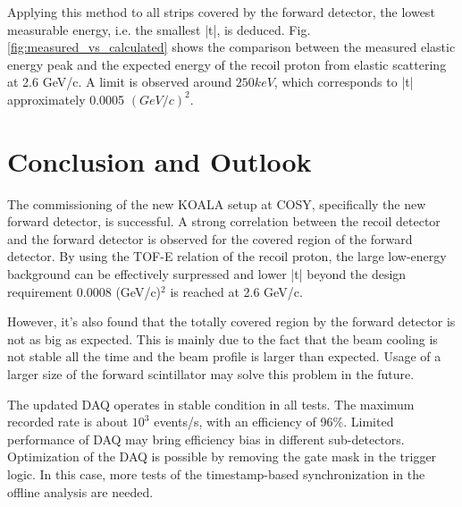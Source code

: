 \documentclass[number,5p]{elsarticle}
\begin{document}
Applying this method to all strips covered by the forward detector, the lowest measurable energy, i.e. the smallest |t|, is deduced.
Fig. \ref{fig:measured_vs_calculated} shows the comparison between the measured
elastic energy peak and the expected energy of the recoil proton from elastic scattering at 2.6 GeV/c.
A limit is observed around \(250 keV\), which corresponds to |t| approximately 0.0005 \((GeV/c)^2\).

\section{Conclusion and Outlook}
\label{sec:conclusion}

The commissioning of the new KOALA setup at COSY, specifically the new forward detector, is successful.
A strong correlation between the recoil detector and the forward detector is
observed for the covered region of the forward detector.
By using the TOF-E relation of the recoil proton, the large low-energy background can be
effectively surpressed and lower |t| beyond the design requirement 0.0008
(GeV/c)$^2$ is reached at 2.6 GeV/c. 

However, it's also found that the totally covered region by the forward detector
is not as big as expected.
This is mainly due to the fact that the beam cooling is not stable all the time
and the beam profile is larger than expected.
Usage of a larger size of the forward scintillator may solve this problem in the future.

The updated DAQ operates in stable condition in all tests.
The maximum recorded rate is about $10^3$ events/s, with an efficiency of 96\%.
Limited performance of DAQ may bring efficiency bias in different sub-detectors.
Optimization of the DAQ is possible by removing the gate mask in the trigger logic.
In this case, more tests of the timestamp-based synchronization in the offline analysis are needed.



\end{document}
